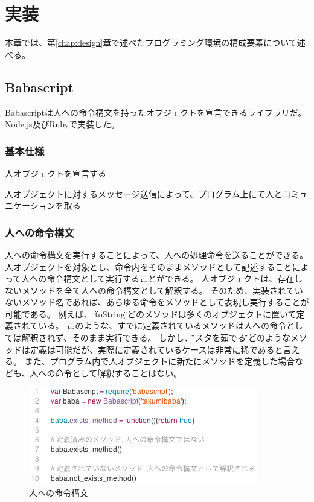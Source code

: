 \chapter{実装}
\label{chap:implementation}

本章では、第\ref{chap:design}章で述べたプログラミング環境の構成要素について述べる。

\section{Babascript}

Babascriptは人への命令構文を持ったオブジェクトを宣言できるライブラリだ。
Node.js及びRubyで実装した。


\subsection{基本仕様}
人オブジェクトを宣言する

人オブジェクトに対するメッセージ送信によって、プログラム上にて人とコミュニケーションを取る

\subsection{人への命令構文}

人への命令構文を実行することによって、人への処理命令を送ることができる。
人オブジェクトを対象とし、命令内をそのままメソッドとして記述することによって人への命令構文として実行することができる。
人オブジェクトは、存在しないメソッドを全て人への命令構文として解釈する。
そのため、実装されていないメソッド名であれば、あらゆる命令をメソッドとして表現し実行することが可能である。
例えば、 \"toString\" などのメソッドは多くのオブジェクトに置いて定義されている。
このような、すでに定義されているメソッドは人への命令としては解釈されず、そのまま実行できる。
しかし、\"パスタを茹でる\"などのようなメソッドは定義は可能だが、実際に定義されているケースは非常に稀であると言える。
また、プログラム内で人オブジェクトに新たにメソッドを定義した場合なども、人への命令として解釈することはない。

\begin{figure}[htbp]
  \begin{center}
  \includegraphics[width=.7\linewidth,bb=0 0 378 160]{images/methodmissing_sample.js.png}
  \end{center}
  \caption{人への命令構文}
  \label{fig:methodmissing_sample}
\end{figure}

